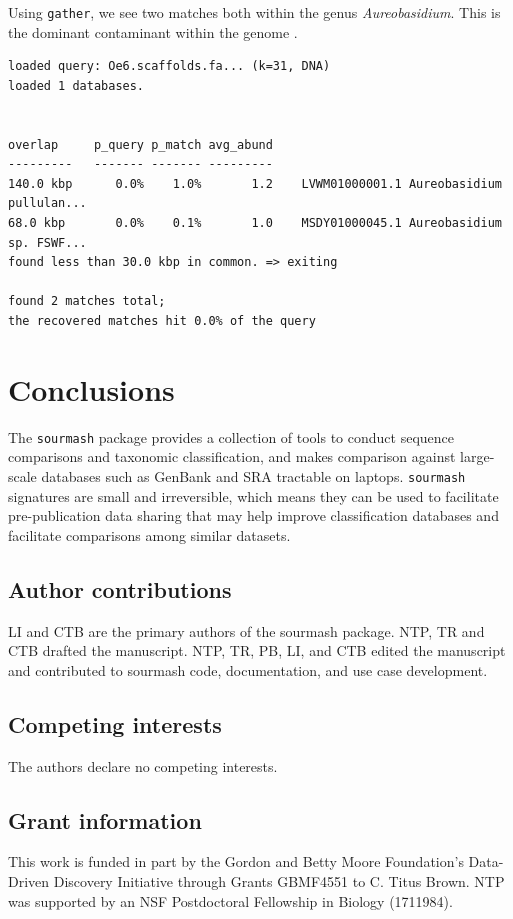 \documentclass[10pt,a4paper,twocolumn]{article}
\begin{document}
Using \lstinline{gather}, we see two matches both within the genus \textit{Aureobasidium}. This is the dominant contaminant within the genome \cite{Reiter2018}.

\begin{lstlisting}[basicstyle=\tiny,]
loaded query: Oe6.scaffolds.fa... (k=31, DNA)
loaded 1 databases.


overlap     p_query p_match avg_abund
---------   ------- ------- ---------
140.0 kbp      0.0%    1.0%       1.2    LVWM01000001.1 Aureobasidium pullulan...
68.0 kbp       0.0%    0.1%       1.0    MSDY01000045.1 Aureobasidium sp. FSWF...
found less than 30.0 kbp in common. => exiting

found 2 matches total;
the recovered matches hit 0.0% of the query
\end{lstlisting}


\section*{Conclusions}

The \lstinline{sourmash} package provides a collection of tools to conduct sequence comparisons and taxonomic classification, and makes comparison against large-scale databases such as GenBank and SRA tractable on laptops. \lstinline{sourmash} signatures are small and irreversible, which means they can be used to facilitate pre-publication data sharing that may help improve classification databases and facilitate comparisons among similar datasets. 


\subsection*{Author contributions}
LI and CTB are the primary authors of the sourmash package. NTP, TR and CTB drafted the manuscript. NTP, TR, PB, LI, and CTB edited the manuscript and contributed to sourmash code, documentation, and use case development. 

\subsection*{Competing interests}
The authors declare no competing interests.

\subsection*{Grant information}
This work is funded in part by the Gordon and Betty Moore Foundation’s Data-Driven Discovery Initiative through Grants GBMF4551 to C. Titus Brown. NTP was supported by an NSF Postdoctoral Fellowship in Biology (1711984).
\end{document}
